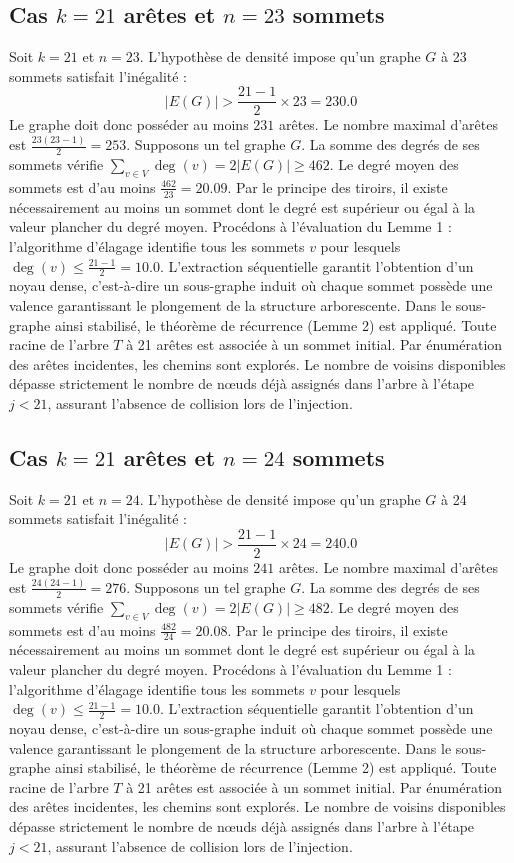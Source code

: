 \documentclass[12pt,a4paper]{article}
\begin{document}
\subsection{Cas $k = 21$ arêtes et $n = 23$ sommets}
Soit $k = 21$ et $n = 23$. L'hypothèse de densité impose qu'un graphe $G$ à 23 sommets satisfait l'inégalité :
$$ |E(G)| > \frac{21-1}{2} \times 23 = 230.0 $$
Le graphe doit donc posséder au moins $231$ arêtes. Le nombre maximal d'arêtes est $\frac{23(23-1)}{2} = 253$.
Supposons un tel graphe $G$. La somme des degrés de ses sommets vérifie $\sum_{v \in V} \deg(v) = 2|E(G)| \geq 462$.
Le degré moyen des sommets est d'au moins $\frac{462}{23} = 20.09$.
Par le principe des tiroirs, il existe nécessairement au moins un sommet dont le degré est supérieur ou égal à la valeur plancher du degré moyen.
Procédons à l'évaluation du Lemme 1 : l'algorithme d'élagage identifie tous les sommets $v$ pour lesquels $\deg(v) \leq \frac{21-1}{2} = 10.0$.
L'extraction séquentielle garantit l'obtention d'un noyau dense, c'est-à-dire un sous-graphe induit où chaque sommet possède une valence garantissant le plongement de la structure arborescente.
Dans le sous-graphe ainsi stabilisé, le théorème de récurrence (Lemme 2) est appliqué. Toute racine de l'arbre $T$ à 21 arêtes est associée à un sommet initial. Par énumération des arêtes incidentes, les chemins sont explorés. Le nombre de voisins disponibles dépasse strictement le nombre de nœuds déjà assignés dans l'arbre à l'étape $j < 21$, assurant l'absence de collision lors de l'injection.

\subsection{Cas $k = 21$ arêtes et $n = 24$ sommets}
Soit $k = 21$ et $n = 24$. L'hypothèse de densité impose qu'un graphe $G$ à 24 sommets satisfait l'inégalité :
$$ |E(G)| > \frac{21-1}{2} \times 24 = 240.0 $$
Le graphe doit donc posséder au moins $241$ arêtes. Le nombre maximal d'arêtes est $\frac{24(24-1)}{2} = 276$.
Supposons un tel graphe $G$. La somme des degrés de ses sommets vérifie $\sum_{v \in V} \deg(v) = 2|E(G)| \geq 482$.
Le degré moyen des sommets est d'au moins $\frac{482}{24} = 20.08$.
Par le principe des tiroirs, il existe nécessairement au moins un sommet dont le degré est supérieur ou égal à la valeur plancher du degré moyen.
Procédons à l'évaluation du Lemme 1 : l'algorithme d'élagage identifie tous les sommets $v$ pour lesquels $\deg(v) \leq \frac{21-1}{2} = 10.0$.
L'extraction séquentielle garantit l'obtention d'un noyau dense, c'est-à-dire un sous-graphe induit où chaque sommet possède une valence garantissant le plongement de la structure arborescente.
Dans le sous-graphe ainsi stabilisé, le théorème de récurrence (Lemme 2) est appliqué. Toute racine de l'arbre $T$ à 21 arêtes est associée à un sommet initial. Par énumération des arêtes incidentes, les chemins sont explorés. Le nombre de voisins disponibles dépasse strictement le nombre de nœuds déjà assignés dans l'arbre à l'étape $j < 21$, assurant l'absence de collision lors de l'injection.
\end{document}

